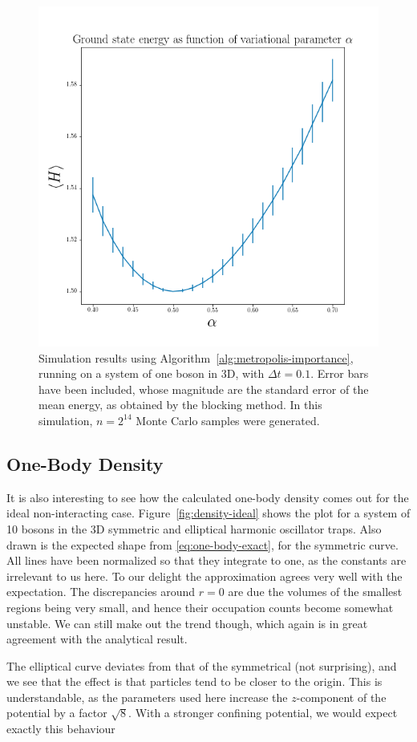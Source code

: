 \documentclass[a4paper, 11pt]{article}
\begin{document}
\begin{figure}[!h]
    \centering
    \includegraphics[width=0.8\linewidth]{../results/error-plot-3D-2-pow-14.png}
    \caption{Simulation results using Algorithm~\ref{alg:metropolis-importance},
    running on a system of one boson in 3D, with $\Delta t=0.1$. Error bars have
    been included, whose
    magnitude are the standard error of the mean energy, as obtained by the
    blocking method. In this simulation, $n=2^{14}$ Monte Carlo samples were
    generated.}
    \label{fig:errorbar}
\end{figure}
\begin{multicols}{2}

\subsection{One-Body Density}

It is also interesting to see how the calculated one-body density comes out for
the ideal non-interacting case. Figure~\ref{fig:density-ideal} shows the plot
for a system of 10 bosons in the 3D symmetric and elliptical harmonic oscillator
traps. Also drawn is the expected shape from \eqref{eq:one-body-exact}, for the
symmetric curve. All lines have been normalized so that they integrate to one,
as the constants are irrelevant to us here. To our delight the approximation
agrees very well with the expectation. The discrepancies around $r=0$ are due
the volumes of the smallest regions being very small, and hence their occupation
counts become somewhat unstable. We can still make out the trend though, which
again is in great agreement with the analytical result.

The elliptical curve deviates from that of the symmetrical (not surprising), and
we see that the effect is that particles tend to be closer to the origin. This
is understandable, as the parameters used here increase the $z$-component of the
potential by a factor $\sqrt{8}$. With a stronger confining potential, we would
expect exactly this behaviour

\end{multicols}
\end{document}

